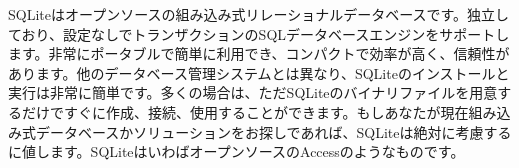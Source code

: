 SQLiteはオープンソースの組み込み式リレーショナルデータベースです。独立しており、設定なしでトランザクションのSQLデータベースエンジンをサポートします。非常にポータブルで簡単に利用でき、コンパクトで効率が高く、信頼性があります。他のデータベース管理システムとは異なり、SQLiteのインストールと実行は非常に簡単です。多くの場合は、ただSQLiteのバイナリファイルを用意するだけですぐに作成、接続、使用することができます。もしあなたが現在組み込み式データベースかソリューションをお探しであれば、SQLiteは絶対に考慮するに値します。SQLiteはいわばオープンソースのAccessのようなものです。

